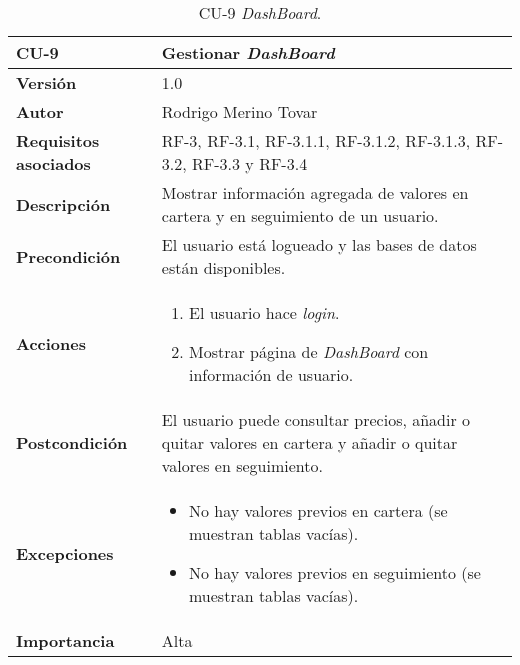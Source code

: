 \begin{table}[p]
	\centering
	\begin{tabularx}{\linewidth}{ p{} p{} }
		\toprule
		\textbf{CU-9}    & \textbf{Gestionar \emph{DashBoard}}\\
		\toprule
		\textbf{Versión}              & 1.0    \\
		\textbf{Autor}                & Rodrigo Merino Tovar \\
		\textbf{Requisitos asociados} & RF-3, RF-3.1, RF-3.1.1, RF-3.1.2, RF-3.1.3, RF-3.2, RF-3.3 y RF-3.4  \\
		\textbf{Descripción}          & Mostrar información agregada de valores en cartera y en seguimiento de un usuario.\\
		\textbf{Precondición}         & El usuario está logueado y las bases de datos están disponibles.  \\
		\textbf{Acciones}             &
		\begin{enumerate}
			\def\labelenumi{\arabic{enumi}.}
			\tightlist
			\item El usuario hace \emph{login}. 
			\item Mostrar página de \emph{DashBoard} con información de usuario.
		\end{enumerate}\\
		\textbf{Postcondición}        & El usuario puede consultar precios, añadir o quitar valores en cartera y añadir o quitar valores en seguimiento. \\
		\textbf{Excepciones}          & 
		\begin{itemize}
			\tightlist
			\item No hay valores previos en cartera (se muestran tablas vacías).
			\item No hay valores previos en seguimiento (se muestran tablas vacías).
		\end{itemize} \\
		\textbf{Importancia}          & Alta \\
		\bottomrule
	\end{tabularx}
	\caption{CU-9 \emph{DashBoard}.}
\end{table}


